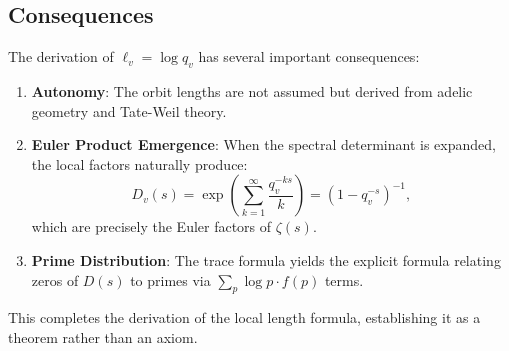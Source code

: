 \subsection{Consequences}

The derivation of $\ell_v = \log q_v$ has several important consequences:

\begin{enumerate}
  \item \textbf{Autonomy}: The orbit lengths are not assumed but derived from adelic geometry and Tate-Weil theory.
  
  \item \textbf{Euler Product Emergence}: When the spectral determinant is expanded, the local factors naturally produce:
  \[
  D_v(s) = \exp\left(\sum_{k=1}^\infty \frac{q_v^{-ks}}{k}\right) = \left(1 - q_v^{-s}\right)^{-1},
  \]
  which are precisely the Euler factors of $\zeta(s)$.
  
  \item \textbf{Prime Distribution}: The trace formula yields the explicit formula relating zeros of $D(s)$ to primes via $\sum_p \log p \cdot f(p)$ terms.
\end{enumerate}

This completes the derivation of the local length formula, establishing it as a theorem rather than an axiom.
